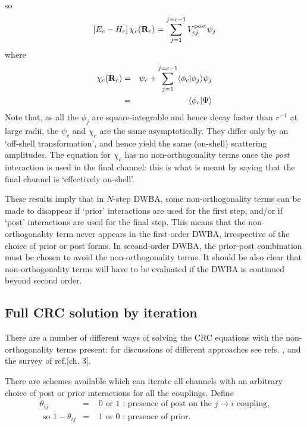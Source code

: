 \documentclass[11pt,a4paper]{article}
\newcommand{\vecR}{{\bf R}}
\begin{document}
so
\begin{eqnarray}
\left [ E_c - H_c \right ] \chi_c ( \vecR_c ) =
   \sum_{j=1} ^ {j=c-1}
           V_{cj}^{\rm post}                    \psi_j
\end{eqnarray}
where
\begin{eqnarray} \nonumber
   \chi_c ( \vecR_c ) & =&\psi_c
         + \sum_{j=1} ^ {j=c-1} \langle\phi_c |\phi_j\rangle\psi_j \\
    &=&\langle\phi_c |\Psi\rangle  \nonumber
\end{eqnarray}
Note that, as all the $\phi_j$ are square-integrable
and hence decay faster than $r ^ {-1}$ at large radii,
the $\psi_c$  and $\chi_c $
are the same asymptotically.
They differ only by an `off-shell transformation',
and hence yield the same (on-shell) scattering amplitudes.
The equation for $\chi_c$ has no non-orthogonality terms once
the {\em post} interaction is used in the final channel:
this is what is meant by saying that the final channel is
`effectively on-shell'.

These results imply that in $N$-step DWBA, some non-orthogonality terms
can be made to
disappear if `prior' interactions are used for the first step, and/or if
`post' interactions are used for the final step.  This means that the
non-orthogonality term never appears in the first-order DWBA, irrespective
of the choice of prior or post forms.  In second-order DWBA, the
prior-post combination must be chosen \cite{uda73}
to avoid the non-orthogonality
terms.  It should be also clear that non-orthogonality terms will have to
be evaluated if the DWBA is continued beyond second order.
\subsection{Full CRC solution by iteration}
\label{nono}

There are a number of different ways of solving the CRC equations with the
non-orthogonality terms present: for discussions of different approaches see refs.
\cite{iman74}, \cite{CV} and the survey of ref.[ch. 3]\cite{SATCH83}.

There are schemes available which can
iterate all channels with an arbitrary choice of post or
prior interactions for all the couplings.
Define
\begin{eqnarray}
\theta_{ij} & = & \mbox{ 0 or 1 : presence of post on the }
                                 j \rightarrow i \mbox{ coupling,}
 \\
 \mbox{ so } 1 - \theta_{ij} & = &\mbox{ 1 or 0 : presence of prior}.
\end{eqnarray}
\end{document}
